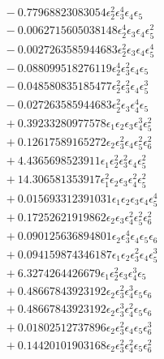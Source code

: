 \documentclass[10pt]{article}
\begin{document}
\begin{align*}
&{}  - 0.77968823083054 \epsilon_{2}^{2} \epsilon_{3}^{4} \epsilon_{4} \epsilon_{5} \\
&{}  - 0.0062715605038148 \epsilon_{2}^{4} \epsilon_{3} \epsilon_{4} \epsilon_{5}^{2} \\
&{}  - 0.0027263585944683 \epsilon_{2}^{2} \epsilon_{3} \epsilon_{4} \epsilon_{5}^{4} \\
&{}  - 0.088099518276119 \epsilon_{2}^{4} \epsilon_{3}^{2} \epsilon_{4} \epsilon_{5} \\
&{}  - 0.048580835185477 \epsilon_{2}^{2} \epsilon_{3}^{2} \epsilon_{4} \epsilon_{5}^{3} \\
&{}  - 0.027263585944683 \epsilon_{2}^{2} \epsilon_{3} \epsilon_{4}^{4} \epsilon_{5} \\
&{}  + 0.39233280977578 \epsilon_{1} \epsilon_{2} \epsilon_{3} \epsilon_{4}^{3} \epsilon_{5}^{2} \\
&{}  + 0.12617589165272 \epsilon_{2} \epsilon_{3}^{2} \epsilon_{4} \epsilon_{5}^{2} \epsilon_{6}^{2} \\
&{}  + 4.4365698523911 \epsilon_{1} \epsilon_{2}^{2} \epsilon_{3}^{2} \epsilon_{4} \epsilon_{5}^{2} \\
&{}  + 14.306581353917 \epsilon_{1}^{2} \epsilon_{2} \epsilon_{3} \epsilon_{4}^{2} \epsilon_{5}^{2} \\
&{}  + 0.015693312391031 \epsilon_{1} \epsilon_{2} \epsilon_{3} \epsilon_{4} \epsilon_{5}^{4} \\
&{}  + 0.17252621919862 \epsilon_{2} \epsilon_{3} \epsilon_{4}^{2} \epsilon_{5}^{2} \epsilon_{6}^{2} \\
&{}  + 0.090125636894801 \epsilon_{2} \epsilon_{3}^{4} \epsilon_{4} \epsilon_{5} \epsilon_{6} \\
&{}  + 0.094159874346187 \epsilon_{1} \epsilon_{2} \epsilon_{3}^{2} \epsilon_{4} \epsilon_{5}^{3} \\
&{}  + 6.3274264426679 \epsilon_{1} \epsilon_{2}^{2} \epsilon_{3} \epsilon_{4}^{3} \epsilon_{5} \\
&{}  + 0.48667843923192 \epsilon_{2} \epsilon_{3}^{2} \epsilon_{4}^{3} \epsilon_{5} \epsilon_{6} \\
&{}  + 0.48667843923192 \epsilon_{2} \epsilon_{3}^{3} \epsilon_{4}^{2} \epsilon_{5} \epsilon_{6} \\
&{}  + 0.01802512737896 \epsilon_{2} \epsilon_{3}^{2} \epsilon_{4} \epsilon_{5} \epsilon_{6}^{3} \\
&{}  + 0.14420101903168 \epsilon_{2} \epsilon_{3}^{2} \epsilon_{4}^{2} \epsilon_{5} \epsilon_{6}^{2} \\

\end{align*}
\end{document}
